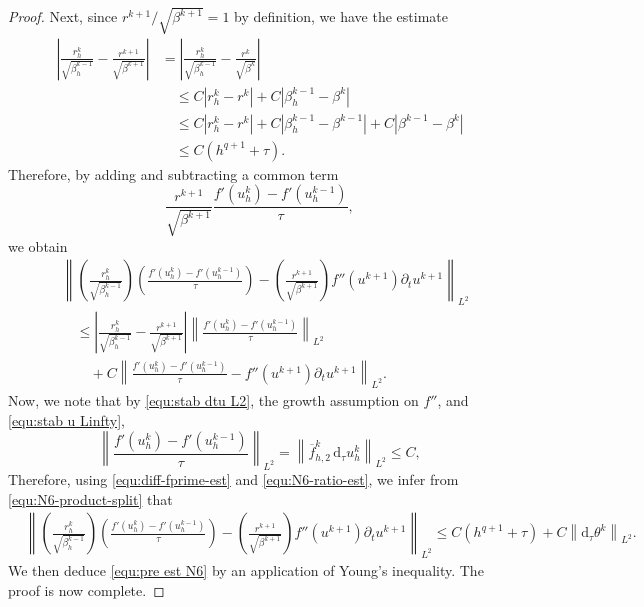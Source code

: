 \documentclass[11pt, reqno]{amsart}
\theoremstyle{definition}
\numberwithin{equation}{section}
\newcommand{\dtt}{\mathrm{d}_\tau}
\newcommand{\norm}[2]{\left\|{#1}\right\|_{#2}}
\newcommand{\abs}[1]{\left|{#1}\right|}
\begin{document}
\begin{proof}
	Next, since $r^{k+1}/\sqrt{\beta^{k+1}}=1$ by definition, we have the estimate
	\begin{align}
		\abs{
			\frac{r_h^k}{\sqrt{\beta_h^{k-1}}}
			-
			\frac{r^{k+1}}{\sqrt{\beta^{k+1}}}
		}
		&
		=
		\abs{
			\frac{r_h^k}{\sqrt{\beta_h^{k-1}}}
			-
			\frac{r^k}{\sqrt{\beta^k}}
		}
		\nonumber\\
		&\quad
		\leq
		C\abs{r_h^k-r^k}
		+
		C\abs{\beta_h^{k-1}-\beta^k}
		\nonumber\\
		&\quad
		\leq
		C\abs{r_h^k-r^k}
		+
		C\abs{\beta_h^{k-1}-\beta^{k-1}}
		+
		C\abs{\beta^{k-1}-\beta^k}
		\nonumber\\
		&\quad
		\leq
		C(h^{q+1}+\tau).
		\label{equ:N6-ratio-est}
	\end{align}
	Therefore, by adding and subtracting a common term
	\[
	\frac{r^{k+1}}{\sqrt{\beta^{k+1}}}
	\frac{f'(u_h^k)-f'(u_h^{k-1})}{\tau},
	\]
	we obtain
	\begin{align}
		&\norm{
			\left(\frac{r_h^k}{\sqrt{\beta_h^{k-1}}}\right)
			\left(
			\frac{f'(u_h^k)-f'(u_h^{k-1})}{\tau}
			\right)
			-
			\left(
			\frac{r^{k+1}}{\sqrt{\beta^{k+1}}}
			\right)
			f''(u^{k+1})\partial_tu^{k+1}
		}{L^2}
		\nonumber\\
		&\quad
		\leq
		\abs{
			\frac{r_h^k}{\sqrt{\beta_h^{k-1}}}
			-
			\frac{r^{k+1}}{\sqrt{\beta^{k+1}}}
		}
		\norm{
			\frac{f'(u_h^k)-f'(u_h^{k-1})}{\tau}
		}{L^2}
		\nonumber\\
		&\qquad
		+
		C
		\norm{
			\frac{f'(u_h^k)-f'(u_h^{k-1})}{\tau}
			-
			f''(u^{k+1})\partial_tu^{k+1}
		}{L^2}.
		\label{equ:N6-product-split}
	\end{align}
	Now, we note that by \eqref{equ:stab dtu L2}, the growth assumption on $f''$, and \eqref{equ:stab u Linfty},
	\[
	\norm{
		\frac{f'(u_h^k)-f'(u_h^{k-1})}{\tau}
	}{L^2}
	=
	\norm{\overline f_{h,2}^k\, \dtt u_h^k}{L^2}
	\leq 
	C,
	\]
	Therefore, using \eqref{equ:diff-fprime-est} and \eqref{equ:N6-ratio-est}, we infer from \eqref{equ:N6-product-split} that
	\begin{align*}
		&\norm{
			\left(\frac{r_h^k}{\sqrt{\beta_h^{k-1}}}\right)
			\left(
			\frac{f'(u_h^k)-f'(u_h^{k-1})}{\tau}
			\right)
			-
			\left(
			\frac{r^{k+1}}{\sqrt{\beta^{k+1}}}
			\right)
			f''(u^{k+1})\partial_tu^{k+1}
		}{L^2}
		\leq
		C(h^{q+1}+\tau)
		+
		C\norm{\dtt\theta^k}{L^2}.
	\end{align*}
	We then deduce \eqref{equ:pre est N6} by an application of Young's inequality. The proof is now complete.
\end{proof}
\end{document}
